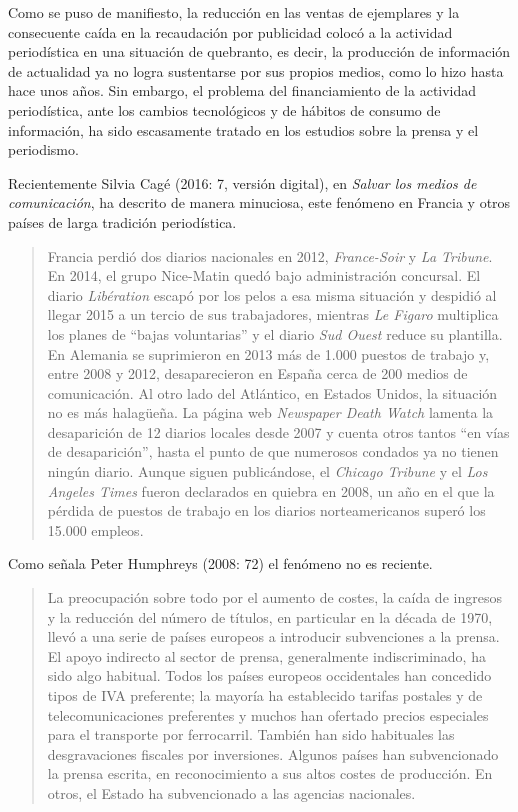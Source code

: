 Como se puso de manifiesto, la reducción en las ventas de ejemplares y la consecuente caída en la recaudación por publicidad colocó a la actividad periodística en una situación de quebranto, es decir, la producción de información de actualidad ya no logra sustentarse por sus propios medios, como lo hizo hasta hace unos años. Sin embargo, el problema del financiamiento de la actividad periodística, ante los cambios tecnológicos y de hábitos de consumo de información, ha sido escasamente tratado en los estudios sobre la prensa y el periodismo.

Recientemente Silvia Cagé (2016: 7, versión digital), en \emph{Salvar los medios de comunicación}, ha descrito de manera minuciosa, este fenómeno en Francia y otros países de larga tradición periodística.

\begin{quote}
Francia perdió dos diarios nacionales en 2012, \emph{France-Soir} y \emph{La Tribune}. En 2014, el grupo Nice-Matin  quedó bajo administración concursal. El diario \emph{Libération} escapó por los pelos a esa misma situación y despidió al llegar 2015 a un tercio de sus trabajadores, mientras \emph{Le Figaro} multiplica los planes de ``bajas voluntarias'' y el diario \emph{Sud Ouest} reduce su plantilla. En Alemania se suprimieron en 2013 más de 1.000 puestos de trabajo y, entre 2008 y 2012, desaparecieron en España cerca de 200 medios de comunicación. Al otro lado del Atlántico, en Estados Unidos, la situación no es más halagüeña. La página web \emph{Newspaper Death Watch} lamenta la desaparición de 12 diarios locales desde 2007 y cuenta otros tantos \enquote{en vías de desaparición}, hasta el punto de que numerosos condados ya no tienen ningún diario. Aunque siguen publicándose, el \emph{Chicago Tribune} y el \emph{Los Angeles Times} fueron declarados en quiebra en 2008, un año en el que la pérdida de puestos de trabajo en los diarios norteamericanos superó los 15.000 empleos.
\end{quote}

Como señala Peter Humphreys (2008: 72) el fenómeno no es reciente.

\begin{quote}
La preocupación sobre todo por el aumento de costes, la caída de ingresos y la reducción del número de títulos, en particular en la década de 1970, llevó a una serie de países europeos a introducir subvenciones a la prensa. El apoyo indirecto al sector de prensa, generalmente indiscriminado, ha sido algo habitual. Todos los países europeos occidentales han concedido tipos de IVA preferente; la mayoría ha establecido tarifas postales y de telecomunicaciones preferentes y muchos han ofertado precios especiales para el transporte por ferrocarril. También han sido habituales las desgravaciones fiscales por inversiones. Algunos países han subvencionado la prensa escrita, en reconocimiento a sus altos costes de producción. En otros, el Estado ha subvencionado a las agencias nacionales.
\end{quote}

